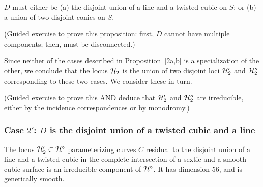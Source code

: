 \begin{proposition}\label {2a,b}
$D$ must either be (a) the disjoint union of a line and a twisted cubic on $S$; or (b) a union of two disjoint conics on $S$. 
\end{proposition}


\begin{exercise}\label{character of D}
(Guided exercise to prove this proposition: first, $D$ cannot have multiple components; then, must be disconnected.)
\end{exercise}


Since neither of the cases described in Proposition~\ref{2a,b} is a specialization of the other, we conclude that the locus $\cH_2$ is the union of two disjoint loci $\cH_{2}'$ and $\cH_{2}''$ corresponding to these two cases. We consider these in turn.


\begin{exercise}
(Guided exercise to prove this AND deduce that $\cH_{2}'$ and $\cH_{2}''$ are irreducible, either by the incidence correspondences or by monodromy.)
\end{exercise}


\subsubsection{Case $2'$: $D$ is the disjoint union of a twisted cubic and a line}

\begin{proposition}
The locus $\cH_{2}' \subset \cH^\circ$ parameterizing curves $C$ residual to the disjoint union of a line and a twisted cubic  in the complete intersection of a sextic and a smooth cubic surface is an irreducible component of  $\cH^\circ$. It has dimension 56, and is generically smooth.
\end{proposition} 
 
